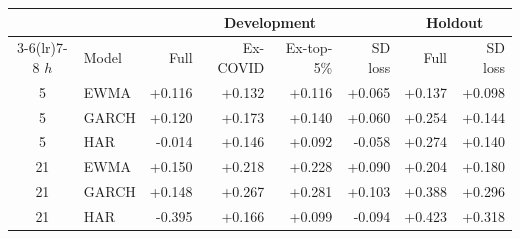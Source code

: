 \begin{tabular}{clrrrrrr}
\toprule
 & & \multicolumn{4}{c}{Development} & \multicolumn{2}{c}{Holdout} \\
\cmidrule(lr){3-6}\cmidrule(lr){7-8}
$h$ & Model & Full & Ex-COVID & Ex-top-5\% & SD loss & Full & SD loss \\
\midrule
5 & EWMA & +0.116 & +0.132 & +0.116 & +0.065 & +0.137 & +0.098 \\
5 & GARCH & +0.120 & +0.173 & +0.140 & +0.060 & +0.254 & +0.144 \\
5 & HAR & -0.014 & +0.146 & +0.092 & -0.058 & +0.274 & +0.140 \\
21 & EWMA & +0.150 & +0.218 & +0.228 & +0.090 & +0.204 & +0.180 \\
21 & GARCH & +0.148 & +0.267 & +0.281 & +0.103 & +0.388 & +0.296 \\
21 & HAR & -0.395 & +0.166 & +0.099 & -0.094 & +0.423 & +0.318 \\
\bottomrule
\end{tabular}
